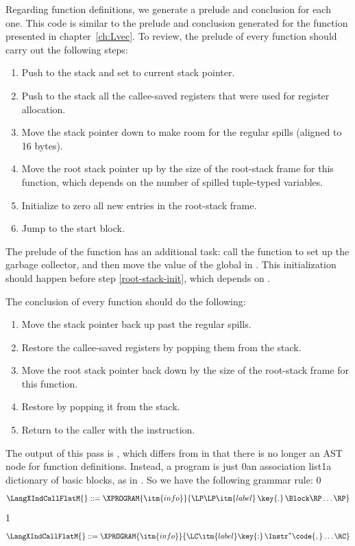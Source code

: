\documentclass[7x10]{TimesAPriori_MIT}%
\def\racketEd{0}
\def\pythonEd{1}
\def\edition{1}
\newcommand{\racket}[1]{{\if\edition\racketEd{#1}\fi}}
\newcommand{\pythonColor}[0]{}
\newcommand{\python}[1]{{\if\edition\pythonEd\pythonColor #1\fi}}
\numberwithin{theorem}{chapter}
\numberwithin{definition}{chapter}
\numberwithin{equation}{chapter}
\begin{document}
Regarding function definitions, we generate a prelude and conclusion
for each one. This code is similar to the prelude and conclusion
generated for the  function presented in
chapter~\ref{ch:Lvec}. To review, the prelude of every function should
carry out the following steps:
\begin{enumerate}
\item Push  to the stack and set  to current stack
  pointer.
\item Push to the stack all the callee-saved registers that were
  used for register allocation.
\item Move the stack pointer  down to make room for the
  regular spills (aligned to 16 bytes).
\item Move the root stack pointer  up by the size of the
  root-stack frame for this function, which depends on the number of
  spilled tuple-typed variables. \label{root-stack-init}
\item Initialize to zero all new entries in the root-stack frame.
\item Jump to the start block.
\end{enumerate}
The prelude of the  function has an additional task: call
the  function to set up the garbage collector, and
then move the value of the global  in
. This initialization should happen before step
\ref{root-stack-init}, which depends on .

The conclusion of every function should do the following:
\begin{enumerate}
\item Move the stack pointer back up past the regular spills.
\item Restore the callee-saved registers by popping them from the
  stack.
\item Move the root stack pointer back down by the size of the
  root-stack frame for this function.
\item Restore  by popping it from the stack.
\item Return to the caller with the  instruction.
\end{enumerate}

The output of this pass is \LangXIndCallFlat{}, which differs from
\LangXIndCall{} in that there is no longer an AST node for function
definitions. Instead, a program is just
\racket{an association list}\python{a dictionary}
of basic blocks, as in \LangXGlobal{}. So we have the following grammar rule:
{\if\edition\racketEd
\[
\LangXIndCallFlatM{} ::= \XPROGRAM{\itm{info}}{\LP\LP\itm{label} \,\key{.}\, \Block \RP\ldots\RP}
\]
\fi}
{\if\edition\pythonEd
\[
\LangXIndCallFlatM{} ::= \XPROGRAM{\itm{info}}{\LC\itm{label}\key{:}\,\Instr^{*}\code{,}\ldots\RC}
\]
\fi}
\end{document}
